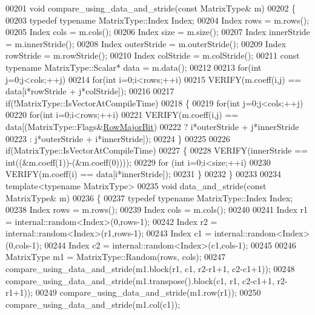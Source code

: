 \begin{DoxyCode}
00201 \textcolor{keywordtype}{void} compare\_using\_data\_and\_stride(\textcolor{keyword}{const} MatrixType& m)
00202 \{
00203   \textcolor{keyword}{typedef} \textcolor{keyword}{typename} MatrixType::Index Index;
00204   Index rows = m.rows();
00205   Index cols = m.cols();
00206   Index size = m.size();
00207   Index innerStride = m.innerStride();
00208   Index outerStride = m.outerStride();
00209   Index rowStride = m.rowStride();
00210   Index colStride = m.colStride();
00211   \textcolor{keyword}{const} \textcolor{keyword}{typename} MatrixType::Scalar* data = m.data();
00212 
00213   \textcolor{keywordflow}{for}(\textcolor{keywordtype}{int} j=0;j<cols;++j)
00214     \textcolor{keywordflow}{for}(\textcolor{keywordtype}{int} i=0;i<rows;++i)
00215       VERIFY(m.coeff(i,j) == data[i*rowStride + j*colStride]);
00216 
00217   \textcolor{keywordflow}{if}(!MatrixType::IsVectorAtCompileTime)
00218   \{
00219     \textcolor{keywordflow}{for}(\textcolor{keywordtype}{int} j=0;j<cols;++j)
00220       \textcolor{keywordflow}{for}(\textcolor{keywordtype}{int} i=0;i<rows;++i)
00221         VERIFY(m.coeff(i,j) == data[(MatrixType::Flags&\hyperlink{group__flags_gae4f56c2a60bbe4bd2e44c5b19cbe8762}{RowMajorBit})
00222                                      ? i*outerStride + j*innerStride
00223                                      : j*outerStride + i*innerStride]);
00224   \}
00225 
00226   \textcolor{keywordflow}{if}(MatrixType::IsVectorAtCompileTime)
00227   \{
00228     VERIFY(innerStride == \textcolor{keywordtype}{int}((&m.coeff(1))-(&m.coeff(0))));
00229     \textcolor{keywordflow}{for} (\textcolor{keywordtype}{int} i=0;i<size;++i)
00230       VERIFY(m.coeff(i) == data[i*innerStride]);
00231   \}
00232 \}
00233 
00234 \textcolor{keyword}{template}<\textcolor{keyword}{typename} MatrixType>
00235 \textcolor{keywordtype}{void} data\_and\_stride(\textcolor{keyword}{const} MatrixType& m)
00236 \{
00237   \textcolor{keyword}{typedef} \textcolor{keyword}{typename} MatrixType::Index Index;
00238   Index rows = m.rows();
00239   Index cols = m.cols();
00240 
00241   Index r1 = internal::random<Index>(0,rows-1);
00242   Index r2 = internal::random<Index>(r1,rows-1);
00243   Index c1 = internal::random<Index>(0,cols-1);
00244   Index c2 = internal::random<Index>(c1,cols-1);
00245 
00246   MatrixType m1 = MatrixType::Random(rows, cols);
00247   compare\_using\_data\_and\_stride(m1.block(r1, c1, r2-r1+1, c2-c1+1));
00248   compare\_using\_data\_and\_stride(m1.transpose().block(c1, r1, c2-c1+1, r2-r1+1));
00249   compare\_using\_data\_and\_stride(m1.row(r1));
00250   compare\_using\_data\_and\_stride(m1.col(c1));

\end{DoxyCode}
